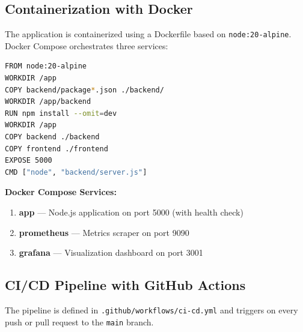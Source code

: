 \documentclass[12pt,a4paper]{article}
\begin{document}
\begin{center}
\end{center}

\begin{center}
\end{center}

\subsection{Containerization with Docker}
The application is containerized using a Dockerfile based on \texttt{node:20-alpine}. Docker Compose orchestrates three services:

\begin{lstlisting}[language=bash, caption=Dockerfile]
FROM node:20-alpine
WORKDIR /app
COPY backend/package*.json ./backend/
WORKDIR /app/backend
RUN npm install --omit=dev
WORKDIR /app
COPY backend ./backend
COPY frontend ./frontend
EXPOSE 5000
CMD ["node", "backend/server.js"]
\end{lstlisting}

\textbf{Docker Compose Services:}
\begin{enumerate}[nosep]
    \item \textbf{app} --- Node.js application on port 5000 (with health check)
    \item \textbf{prometheus} --- Metrics scraper on port 9090
    \item \textbf{grafana} --- Visualization dashboard on port 3001
\end{enumerate}

\begin{center}
\end{center}

\subsection{CI/CD Pipeline with GitHub Actions}
The pipeline is defined in \texttt{.github/workflows/ci-cd.yml} and triggers on every push or pull request to the \texttt{main} branch.
\end{document}
